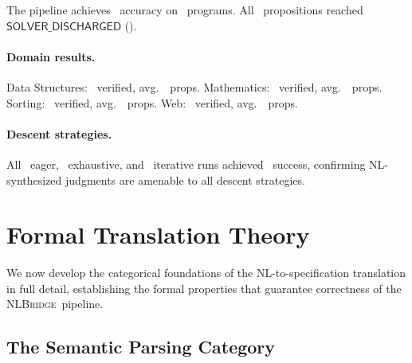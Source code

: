 \documentclass[11pt]{article}
\newcommand{\NLBridge}{\textsc{NLBridge}}
\newcommand{\SolverDisch}{\mathsf{SOLVER\_DISCHARGED}}
\begin{document}
The pipeline achieves \expAccuracy\ accuracy on \expTotalPrograms\
programs.  All \compTrustSolverdischarged\ propositions reached
$\SolverDisch$ (\compTrustSolverdischargedPct).

\paragraph{Domain results.}
Data Structures: \expDomainDsVerified\ verified, avg.\
\expDomainDsAvgProps\ props.  Mathematics: \expDomainMathVerified\
verified, avg.\ \expDomainMathAvgProps\ props.  Sorting:
\expDomainSortVerified\ verified, avg.\ \expDomainSortAvgProps\ props.
Web: \expDomainWebVerified\ verified, avg.\ \expDomainWebAvgProps\
props.

\paragraph{Descent strategies.}
All \compDescentEagerRuns\ eager, \compDescentExhaustiveRuns\
exhaustive, and \compDescentIterativeRuns\ iterative runs achieved
\compDescentEagerRate\ success, confirming NL-synthesized judgments
are amenable to all descent strategies.

\section{Formal Translation Theory}\label{sec:translation-theory}

We now develop the categorical foundations of the NL-to-specification
translation in full detail, establishing the formal properties that
guarantee correctness of the \NLBridge\ pipeline.

\subsection{The Semantic Parsing Category}
\end{document}
